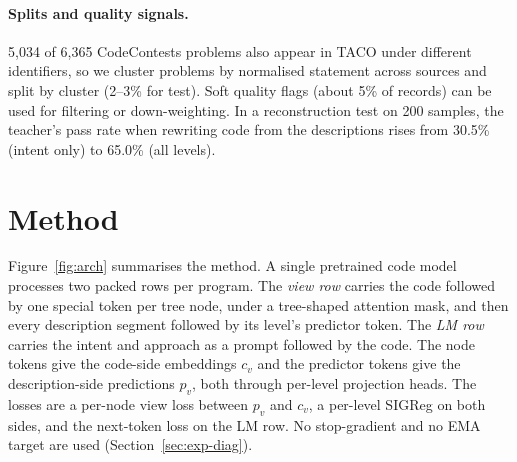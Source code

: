 \documentclass[11pt]{article}
\begin{document}
\paragraph{Splits and quality signals.}
5,034 of 6,365 CodeContests problems also appear in TACO under different identifiers, so we cluster problems by
normalised statement across sources and split by cluster (2--3\% for test). Soft quality flags (about 5\% of
records) can be used for filtering or down-weighting. In a reconstruction test on 200 samples, the teacher's pass
rate when rewriting code from the descriptions rises from 30.5\% (intent only) to 65.0\% (all levels).

\section{Method}
\label{sec:arch}

Figure~\ref{fig:arch} summarises the method. A single pretrained code model processes two packed rows per program.
The \emph{view row} carries the code followed by one special token per tree node, under a tree-shaped attention
mask, and then every description segment followed by its level's predictor token. The \emph{LM row} carries the
intent and approach as a prompt followed by the code. The node tokens give the code-side embeddings $c_v$ and the
predictor tokens give the description-side predictions $p_v$, both through per-level projection heads. The losses
are a per-node view loss between $p_v$ and $c_v$, a per-level SIGReg on both sides, and the next-token loss on the
LM row. No stop-gradient and no EMA target are used (Section~\ref{sec:exp-diag}).
\end{document}
